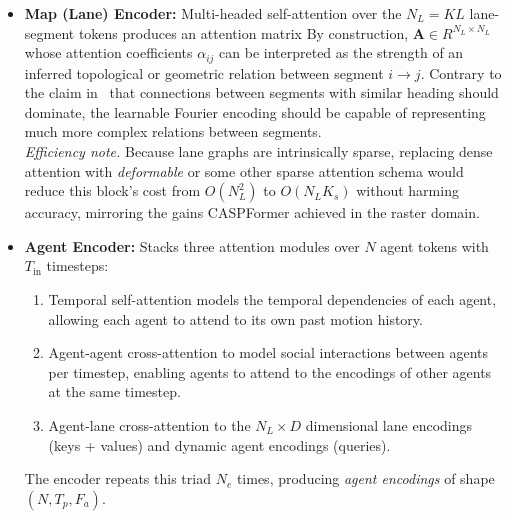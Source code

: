 \begin{itemize}[leftmargin=*]
    \item \textbf{Map (Lane) Encoder:}
        Multi-headed self-attention over the \(N_L = KL\) lane-segment tokens produces an attention matrix
        By construction, \(\mathbf{A} \in R^{N_L \times N_L}\) whose attention coefficients \(\alpha_{ij}\) can be interpreted as the strength of an inferred topological or geometric relation between segment \(i\!\rightarrow\!j\). Contrary to the claim in~\cite{lmformerYadav2025} that connections between segments with similar heading should dominate, the learnable Fourier encoding should be capable of representing much more complex relations between segments.\\
        \emph{Efficiency note.} Because lane graphs are intrinsically sparse, replacing dense attention with \emph{deformable} or some other sparse attention schema would reduce this block's cost from \(O(N_L^2)\) to \(O(N_L K_s)\) without harming accuracy, mirroring the gains CASPFormer achieved in the raster domain.
  \item \textbf{Agent Encoder:}
        Stacks three attention modules over \(N\) agent tokens with \(T_{\text{in}}\) timesteps:
        \begin{enumerate}
          \item Temporal self-attention models the temporal dependencies of each agent, allowing each agent to attend to its own past motion history.
          \item Agent-agent cross-attention to model social interactions between agents per timestep, enabling agents to attend to the encodings of other agents at the same timestep.
          \item Agent-lane cross-attention to the \(N_L \times D \) dimensional lane encodings (keys + values) and dynamic agent encodings (queries).
        \end{enumerate}
        The encoder repeats this triad \(N_e\) times, producing \emph{agent encodings} of shape \((N, T_p, F_a)\).
\end{itemize}

